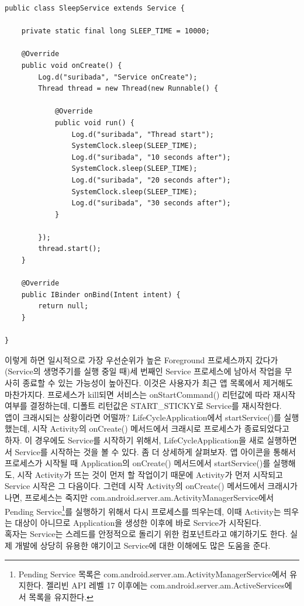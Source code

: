 \begin{lstlisting}[frame=single, caption=SleepService, label=SleepService]
public class SleepService extends Service {

	private static final long SLEEP_TIME = 10000;
	
	@Override
	public void onCreate() {
		Log.d("suribada", "Service onCreate");
		Thread thread = new Thread(new Runnable() {

			@Override
			public void run() {
				Log.d("suribada", "Thread start");
				SystemClock.sleep(SLEEP_TIME);
				Log.d("suribada", "10 seconds after");
				SystemClock.sleep(SLEEP_TIME);
				Log.d("suribada", "20 seconds after");
				SystemClock.sleep(SLEEP_TIME);
				Log.d("suribada", "30 seconds after");
			}
			
		});
		thread.start();
	}
	
	@Override
	public IBinder onBind(Intent intent) {
		return null;
	}

}
\end{lstlisting}
이렇게 하면 일시적으로 가장 우선순위가 높은 Foreground 프로세스까지 갔다가(Service의 생명주기를 실행 중일 때)세 번째인 Service 프로세스에 남아서 작업을 무사히 종료할 수 있는 가능성이 높아진다.
이것은 사용자가 최근 앱 목록에서 제거해도 마찬가지다. 프로세스가 kill되면 서비스는 onStartCommand() 리턴값에 따라 재시작 여부를 결정하는데, 디폴트 리턴값은 START\_STICKY로 Service를 재시작한다.\\

앱이 크래시되는 상황이라면 어떨까? LifeCycleApplication에서 startService()를 실행했는데, 시작 Activity의 onCreate() 메서드에서 크래시로 프로세스가 종료되었다고 하자. 이 경우에도 Service를 시작하기 위해서, LifeCycleApplication을 새로 실행하면서 Service를 시작하는 것을 볼 수 있다.
좀 더 상세하게 살펴보자. 앱 아이콘을 통해서 프로세스가 시작될 때 Application의 onCreate() 메서드에서 startService()를 실행해도, 시작 Activity가 뜨는 것이 먼저 할 작업이기 때문에 Activity가 먼저 시작되고 Service 시작은 그 다음이다.
그런데 시작 Activity의 onCreate() 메서드에서 크래시가 나면, 프로세스는 죽지만 com.android.server.am.ActivityManagerService에서 Pending Service\footnote{Pending Service 목록은 com.android.server.am.ActivityManagerService에서 유지한다. 젤리빈 API 레벨 17 이후에는 com.android.server.am.ActiveServices에서 목록을 유지한다.}를 실행하기 위해서 다시 프로세스를 띄우는데, 이때 Activity는 띄우는 대상이 아니므로 Application을 생성한 이후에 바로 Service가 시작된다.\\

혹자는 Service는 스레드를 안정적으로 돌리기 위한 컴포넌트라고 얘기하기도 한다. 실제 개발에 상당히 유용한 얘기이고 Service에 대한 이해에도 많은 도움을 준다.\\


